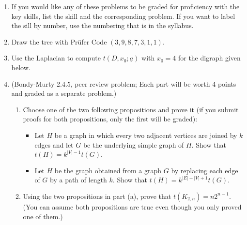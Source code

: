\documentclass[12pt]{article}
\begin{document}
\begin{enumerate}
\item[0.] If you would like any of these problems to be graded for proficiency with the key skills, list the skill and the corresponding problem.  If you want to label the sill by number, use the numbering that is in the syllabus.
  \item Draw the tree with Pr\"ufer Code $(3,9,8,7,3,1,1)$. 
    \item  Use the Laplacian to compute $t(D,x_0; \underline{a})$ with $x_0=4$ for the digraph  given below. 
    \begin{center}
    
\end{center}

     \item (Bondy-Murty 2.4.5, peer review problem; Each part will be worth 4 points and
graded as a separate problem.)
     \begin{enumerate}
 \item    Choose one of the two following propositions and prove it (if you submit proofs for both propositions, only the first will be graded):
     \begin{itemize}
     \item Let $H$ be a graph in which every two adjacent vertices are joined by $k$ edges and let $G$ be the underlying simple graph of $H$. Show that $t(H)=k^{|V|-1}t(G)$. 
     \item Let $H$ be the graph obtained from a graph $G$ by replacing each edge of $G$ by a path of length $k$. Show that $t(H)=k^{|E|-|V|+1}t(G)$. 
     \end{itemize}
     
     \item Using the two propositions in part (a), prove that $t(K_{2,n})=n2^{n-1}$.  (You can assume both propositions are true even though you only proved one of them.)
     \end{enumerate}


\end{enumerate}
\end{document}
